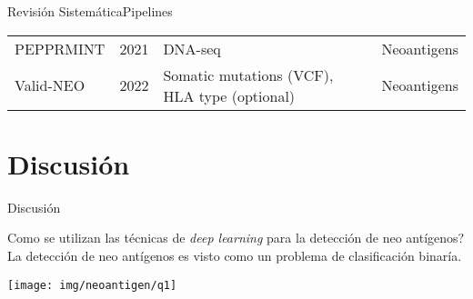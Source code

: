 \documentclass[10pt]{beamer}
\newcommand{\1}{
	\setbeamertemplate{background}{
		\texttt{[image: img/1]}
		\tikz[overlay] \fill[fill opacity=0.75,fill=white] (0,0) rectangle (-\paperwidth,\paperheight);
	}
}
\begin{document}
\begin{frame}{Revisión Sistemática}{Pipelines}
\begin{table}[]
{\begin{tabular}{lp{1.2cm}p{2.5cm}p{2.5cm}}
				PEPPRMINT         & 2021 \cite{zhou2021prioritizing}         & DNA-seq                                                  & Neoantigens                                        \\
				
				Valid-NEO       & 2022 \cite{terai2022valid}             & Somatic mutations (VCF), HLA type (optional)          & Neoantigens                                       
			\end{tabular}
		}
	\end{table}	
\end{frame}




\section{Discusión}


\begin{frame}{Discusión}{}
	\begin{block}{Como se utilizan las técnicas de \textit{deep learning} para la detección de neo antígenos?}
		 La detección de neo antígenos es visto como un problema de clasificación binaría.
	\end{block}

	\centering
	\texttt{[image: img/neoantigen/q1]}
	
\end{frame}
\end{document}
